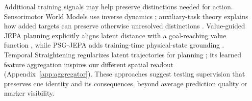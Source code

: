 Additional training signals may help preserve distinctions needed for action.
Sensorimotor World Models use inverse dynamics
\citep{ivashkov2026sensorimotor}; auxiliary-task theory explains how added
targets can preserve otherwise unresolved distinctions \citep{yu2025auxjepa}.
Value-guided JEPA planning explicitly aligns latent distance with a
goal-reaching value function \citep{destrade2025value}, while PSG-JEPA adds
training-time physical-state grounding \citep{yan2026psgjepa}.
Temporal Straightening regularizes latent trajectories for planning
\citep{wang2026temporal}; its learned feature aggregation inspires our
different spatial readout (Appendix~\ref{app:aggregator}). These approaches suggest testing supervision that preserves cue identity
and its consequences, beyond average prediction quality or marker visibility.
